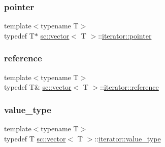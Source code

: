 \mbox{\label{classsc_1_1vector_1_1iterator_a518f02aadbb3fd937bdbda24120d2678}} 
\subsubsection{\texorpdfstring{pointer}{pointer}}
{\footnotesize\ttfamily template$<$typename T$>$ \\
typedef T$\ast$ \mbox{\hyperlink{classsc_1_1vector}{sc\+::vector}}$<$ T $>$\+::\mbox{\hyperlink{classsc_1_1vector_1_1iterator_a518f02aadbb3fd937bdbda24120d2678}{iterator\+::pointer}}}

\mbox{\label{classsc_1_1vector_1_1iterator_a266d58fdf67f2129ef3dc99efd652e15}} 
\subsubsection{\texorpdfstring{reference}{reference}}
{\footnotesize\ttfamily template$<$typename T$>$ \\
typedef T\& \mbox{\hyperlink{classsc_1_1vector}{sc\+::vector}}$<$ T $>$\+::\mbox{\hyperlink{classsc_1_1vector_1_1iterator_a266d58fdf67f2129ef3dc99efd652e15}{iterator\+::reference}}}

\mbox{\label{classsc_1_1vector_1_1iterator_acdc3cf870971e4f5f67e3774728583e8}} 
\subsubsection{\texorpdfstring{value\+\_\+type}{value\_type}}
{\footnotesize\ttfamily template$<$typename T$>$ \\
typedef T \mbox{\hyperlink{classsc_1_1vector}{sc\+::vector}}$<$ T $>$\+::\mbox{\hyperlink{classsc_1_1vector_1_1iterator_acdc3cf870971e4f5f67e3774728583e8}{iterator\+::value\+\_\+type}}}



